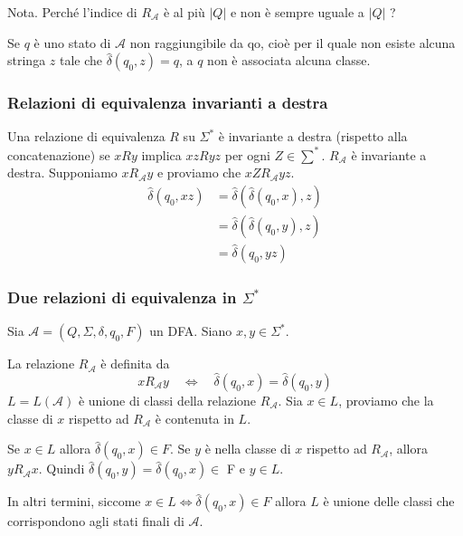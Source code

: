 Nota. Perché l'indice di $R_{\mathcal{A}}$ è al più $|Q|$ e non è sempre uguale a $|Q|$ ?


Se $q$ è uno stato di $\mathcal{A}$ non raggiungibile da qo, cioè per il quale non esiste alcuna stringa $z$ tale che $\hat{\delta}\left(q_{0}, z\right)=q$, a $q$ non è associata alcuna classe.

\subsubsection{Relazioni di equivalenza invarianti a destra}

Una relazione di equivalenza $R$ su $\Sigma^{*}$ è invariante a destra (rispetto alla concatenazione) se $x R y$ implica $x z R y z$ per ogni $Z \in \sum^{*}$.
$R_{\mathcal{A}}$ è invariante a destra. Supponiamo $x R_{\mathcal{A}} y$ e proviamo che $x Z R_{\mathcal{A}} y z$.
$$
\begin{aligned}
\hat{\delta}\left(q_{0}, x z\right) &=\hat{\delta}\left(\hat{\delta}\left(q_{0}, x\right), z\right) \\
&=\hat{\delta}\left(\hat{\delta}\left(q_{0}, y\right), z\right) \\
&=\hat{\delta}\left(q_{0}, y z\right)
\end{aligned}
$$

\subsubsection{Due relazioni di equivalenza in $\Sigma^*$}

Sia $\mathcal{A}=\left(Q, \Sigma, \delta, q_{0}, F\right)$ un DFA. Siano $x, y \in \Sigma^{*}$.

La relazione $R_{\mathcal{A}}$ è definita da
$$
x R_{\mathcal{A}} y \quad \Leftrightarrow \quad \hat{\delta}\left(q_{0}, x\right)=\hat{\delta}\left(q_{0}, y\right)
$$
$L=L(\mathcal{A})$ è unione di classi della relazione $R_{\mathcal{A}}$.
Sia $x \in L$, proviamo che la classe di $x$ rispetto ad $R_{\mathcal{A}}$ è contenuta in $L$.

Se $x \in L$ allora $\hat{\delta}\left(q_{0}, x\right) \in F$. Se $y$ è nella classe di $x$ rispetto ad $R_{\mathcal{A}}$, allora $y R_{\mathcal{A}} x$. Quindi $\hat{\delta}\left(q_{0}, y\right)=\hat{\delta}\left(q_{0}, x\right) \in$ F e $y \in L$.

In altri termini, siccome $x \in L \Leftrightarrow \hat{\delta}\left(q_{0}, x\right) \in F$ allora $L$ è unione delle classi che corrispondono agli stati finali di $\mathcal{A}$.


